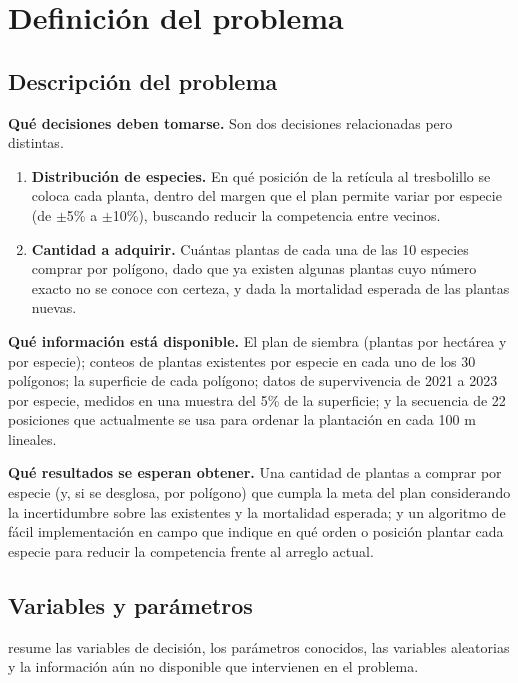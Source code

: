 \section{Definición del problema}
\label{sec:definicion-problema}

\subsection{Descripción del problema}
\label{subsec:descripcion-problema}

\textbf{Qué decisiones deben tomarse.} Son dos decisiones relacionadas pero distintas.

\begin{enumerate}
\item \textbf{Distribución de especies.} En qué posición de la retícula al tresbolillo se coloca cada planta, dentro del margen que el plan permite variar por especie (de $\pm$5\% a $\pm$10\%), buscando reducir la competencia entre vecinos.
\item \textbf{Cantidad a adquirir.} Cuántas plantas de cada una de las 10 especies comprar por polígono, dado que ya existen algunas plantas cuyo número exacto no se conoce con certeza, y dada la mortalidad esperada de las plantas nuevas.
\end{enumerate}

\textbf{Qué información está disponible.} El plan de siembra (plantas por hectárea y por especie); conteos de plantas existentes por especie en cada uno de los 30 polígonos; la superficie de cada polígono; datos de supervivencia de 2021 a 2023 por especie, medidos en una muestra del 5\% de la superficie; y la secuencia de 22 posiciones que actualmente se usa para ordenar la plantación en cada 100 m lineales.

\textbf{Qué resultados se esperan obtener.} Una cantidad de plantas a comprar por especie (y, si se desglosa, por polígono) que cumpla la meta del plan considerando la incertidumbre sobre las existentes y la mortalidad esperada; y un algoritmo de fácil implementación en campo que indique en qué orden o posición plantar cada especie para reducir la competencia frente al arreglo actual.

\subsection{Variables y parámetros}
\label{subsec:variables-parametros}

 resume las variables de decisión, los parámetros conocidos, las variables aleatorias y la información aún no disponible que intervienen en el problema.

